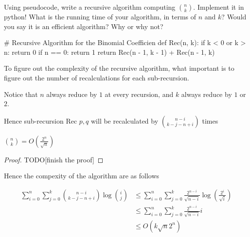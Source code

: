 \documentclass[11pt,a4paper,oneside]{article}
\begin{document}
\begin{problem}{3} 
        Using pseudocode, write a recursive algorithm computing
        ${n \choose k}$. Implement it in python! What is 
        the running time of your algorithm, in terms of $n$ and $k$? Would you say it is an efficient
        algorithm? Why or why not?
    \solution
    \begin{python}
# Recursive Algorithm for the Binomial Coefficien
def Rec(n, k):
    if k < 0 or k > n:
        return 0
    if n == 0:
        return 1
    return Rec(n - 1, k - 1) + Rec(n - 1, k)
    \end{python}

    To figure out the complexity of the recursive algorithm, what important is to figure out the number of recalculations for each sub-recursion.

    Notice that \( n \) always reduce by \( 1 \) at every recursion, and \( k \) always reduce by \( 1 \) or \( 2 \).

    Hence sub-recursion Rec \(p, q\) will be recalculated by \( {n - i \choose k - j - n + i} \) times

    \begin{lemma}
        \({n \choose k} = O(\frac{2^n}{\sqrt{n}})\)
    \begin{proof}
    TODO[finish the proof]
    \end{proof}
    \end{lemma}
    Hence the compexity of the algorithm are as follows

    \[
        \begin{split}
            \sum_{i = 0}^{n} \sum_{j = 0}^k {n - i \choose k - j - n + i} \log{i \choose j} &\leq \sum_{i=0}^{n} \sum_{j=0}^k \frac{2^{n - i}}{\sqrt{n-i}} \log(\frac{2^i}{\sqrt{i}}) \\
            &\leq \sum_{i=0}^{n} \sum_{j=0}^k \frac{2^{n - i}}{\sqrt{n-i}} i \\
            &\leq O(k \sqrt{n}2^n)
        \end{split}
    \]
\end{problem}
\end{document}
